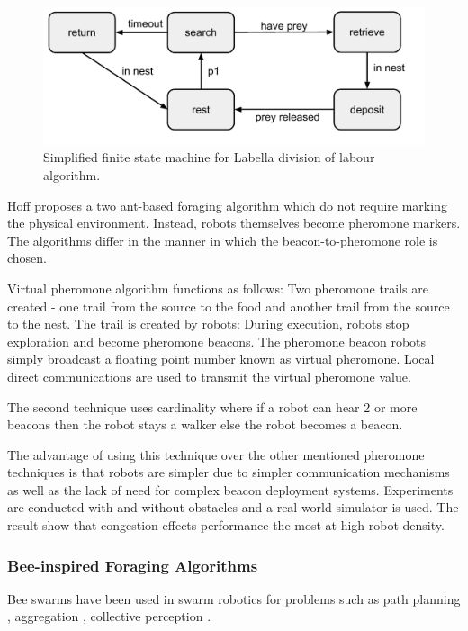 \begin{figure}
\includegraphics[width=\textwidth]{chapters/chapter2/figures/LabellaFSM.pdf}
\caption{Simplified finite state machine for Labella division of labour algorithm. }
\end{figure} 

Hoff \cite{hoff2010two} proposes a two ant-based foraging algorithm which do not require marking the physical environment. Instead, robots themselves become pheromone markers. The algorithms differ in the manner in which the beacon-to-pheromone role is chosen. 

Virtual pheromone algorithm functions as follows: Two pheromone trails are created - one trail from the source to the food and another trail from the source to the nest. The trail is created by robots: During execution, robots stop exploration and become pheromone beacons. The pheromone beacon robots simply broadcast a floating point number known as virtual pheromone. 
Local direct communications are used to transmit the virtual pheromone value.

The second technique uses cardinality where if a robot can hear 2 or more beacons then the robot stays a walker else the robot becomes a beacon. %

The advantage of using this technique over the other mentioned pheromone techniques is that robots are simpler due to simpler communication mechanisms as well as the lack of need for complex beacon deployment systems. Experiments are conducted with and without obstacles and a real-world simulator is used. The result show that congestion effects performance the most at high robot density. %

\subsubsection{Bee-inspired Foraging Algorithms}
Bee swarms have been used in swarm robotics for problems such as path planning \cite{lin2009chaotic}, aggregation \cite{kernbach2009re}, collective perception \cite{schmickl2007collective}. 

